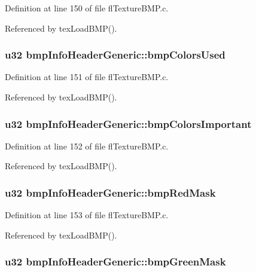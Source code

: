 Definition at line 150 of file fl\-Texture\-BMP.c.

Referenced by tex\-Load\-BMP().
\subsubsection{\setlength{\rightskip}{0pt plus 5cm}u32 {\bf bmp\-Info\-Header\-Generic::bmp\-Colors\-Used}}\label{structbmpInfoHeaderGeneric_f6c871881354ccb1b0a01ebccf0f6cd0}




Definition at line 151 of file fl\-Texture\-BMP.c.

Referenced by tex\-Load\-BMP().
\subsubsection{\setlength{\rightskip}{0pt plus 5cm}u32 {\bf bmp\-Info\-Header\-Generic::bmp\-Colors\-Important}}\label{structbmpInfoHeaderGeneric_63e4e3aa4f6c95858cb28d2944bc1262}




Definition at line 152 of file fl\-Texture\-BMP.c.

Referenced by tex\-Load\-BMP().
\subsubsection{\setlength{\rightskip}{0pt plus 5cm}u32 {\bf bmp\-Info\-Header\-Generic::bmp\-Red\-Mask}}\label{structbmpInfoHeaderGeneric_3e63a7f662f07631c12b86af2e62ae13}




Definition at line 153 of file fl\-Texture\-BMP.c.

Referenced by tex\-Load\-BMP().
\subsubsection{\setlength{\rightskip}{0pt plus 5cm}u32 {\bf bmp\-Info\-Header\-Generic::bmp\-Green\-Mask}}\label{structbmpInfoHeaderGeneric_504a384406aeed54ab1ea3dec2d585a9}




